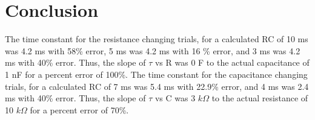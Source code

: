 \documentclass[11pt, titlepage]{article}
\begin{document}
\section*{Conclusion}

The time constant for the resistance changing trials, for a calculated RC of 10 ms was 4.2 ms with 58\% error, 5 ms was 4.2 ms with 16 \% error, and 3 ms was 4.2 ms with 40\% error. Thus, the slope of $\tau$ vs R was 0 F to the actual capacitance of 1 nF for a percent error of 100\%. The time constant for the capacitance changing trials, for a calculated RC of 7 ms was 5.4 ms with 22.9\% error, and 4 ms was 2.4 ms with 40\% error. Thus, the slope of $\tau$ vs C was 3 $k\Omega$ to the actual resistance of 10 $k\Omega$ for a percent error of 70\%.
\end{document}
